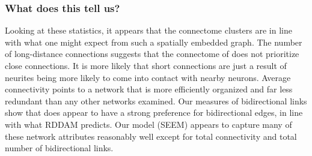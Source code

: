 \subsubsection{What does this tell us?} 
Looking at these statistics, it appears that the \ce connectome clusters are in line with what one might expect from such a spatially embedded graph. 
The number of long-distance connections suggests that the connectome of \ce does not prioritize close connections. 
It is more likely that short connections are just a result of neurites being more likely to come into contact with nearby neurons. 
Average connectivity points to a network that is more efficiently organized and far less redundant than any other networks examined. 
Our measures of bidirectional links show that \ce does appear to have a strong preference for bidirectional edges, in line with what RDDAM predicts. 
Our model (SEEM) appears to capture many of these network attributes reasonably well except for total connectivity and total number of bidirectional links.